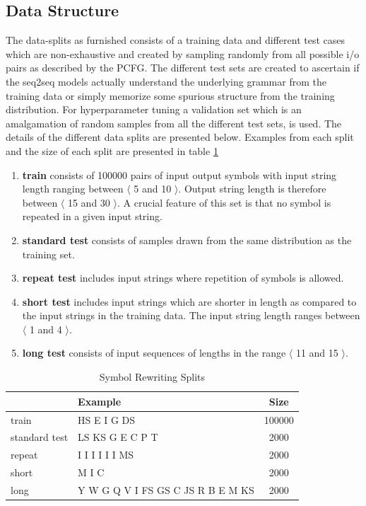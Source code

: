 \subsection{Data Structure}
The data-splits as furnished \citep{Weber2018} consists of a training data and different test cases which are non-exhaustive and created by sampling randomly from all possible i/o pairs as described by the PCFG. The different test sets are created to ascertain if the seq2seq models actually understand the underlying grammar from the training data or simply memorize some spurious structure from the training distribution. For hyperparameter tuning a validation set which is an amalgamation of random samples from all the different test sets, is used. The details of the different data splits are presented below. Examples from each split and the size of each split are presented in table \ref{sr:stats}
\begin{enumerate}
	\item \textbf{train} consists of 100000 pairs of input output symbols with input string length ranging between $\langle$ 5 and 10 $\rangle$. Output string length is therefore between $\langle$ 15 and 30 $\rangle$. A crucial feature of this set is that no symbol is repeated in a given input string.
	\item \textbf{standard test} consists of samples drawn from the same distribution as the training set.
	\item \textbf{repeat test} includes input strings where repetition of symbols is allowed.
	\item \textbf{short test} includes input strings which are shorter in length as compared to the input strings in the training data. The input string length ranges between $\langle$ 1 and 4 $\rangle$.
	\item \textbf{long test} consists of input sequences of lengths in the range $\langle$ 11 and 15 $\rangle$.
\end{enumerate}

\begin{table}[ht]
	\centering
	\begin{tabular}{l|lc}
		& Example & Size\\
		\hline
		train & HS E I G DS  & 100000 \\
		standard test & LS KS G E C P T & 2000 \\
		repeat & I I I I I I MS & 2000 \\
		short & M I C & 2000 \\
		long & Y W G Q V I FS GS C JS R B E M KS & 2000 \\
	\end{tabular}
	\caption{Symbol Rewriting Splits}
	\label{sr:stats}
\end{table}

